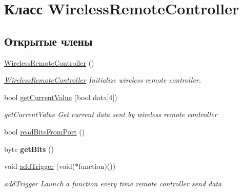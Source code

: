 \hypertarget{class_wireless_remote_controller}{\section{Класс Wireless\-Remote\-Controller}
\label{class_wireless_remote_controller}
}
\subsection*{Открытые члены}
\begin{DoxyCompactItemize}
\item 
\hyperlink{class_wireless_remote_controller_ab8837249a4c68875aeaff238c2fde2a8}{Wireless\-Remote\-Controller} ()
\begin{DoxyCompactList}\small\item\em \hyperlink{class_wireless_remote_controller}{Wireless\-Remote\-Controller} Initialize wireless remote controller. \end{DoxyCompactList}\item 
bool \hyperlink{class_wireless_remote_controller_a4f3b935db3c689f04de63dc088927798}{get\-Current\-Value} (bool data\mbox{[}4\mbox{]})
\begin{DoxyCompactList}\small\item\em get\-Current\-Value Get current data sent by wireless remote controller \end{DoxyCompactList}\item 
bool \hyperlink{class_wireless_remote_controller_a9e03515a61eb5b1dc60834b4b9edeb3d}{read\-Bits\-From\-Port} ()
\item 
\hypertarget{class_wireless_remote_controller_a58a26da5d3e98bd4698d3e7b20006afa}{byte {\bfseries get\-Bits} ()}\label{class_wireless_remote_controller_a58a26da5d3e98bd4698d3e7b20006afa}

\item 
void \hyperlink{class_wireless_remote_controller_a4c7990f3944583e47d285b921a817374}{add\-Trigger} (void($\ast$function)())
\begin{DoxyCompactList}\small\item\em add\-Trigger Launch a function every time remote controller send data \end{DoxyCompactList}\end{DoxyCompactItemize}


